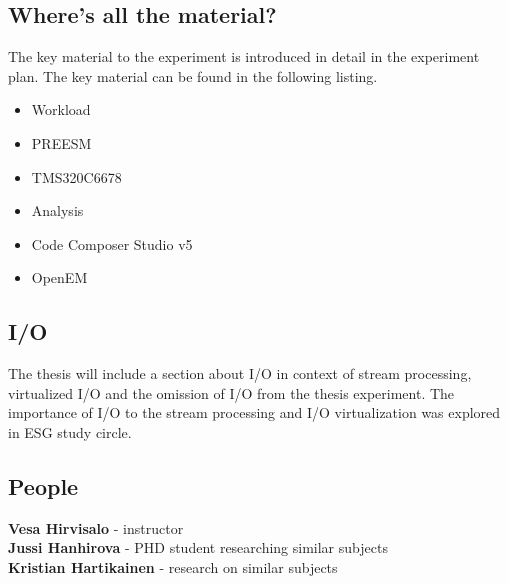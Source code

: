 \subsection{Where's all the material?}
The key material to the experiment is introduced in detail in the experiment plan. The key material can be found in the following listing.
\begin{itemize}
\item Workload
\item PREESM
\item TMS320C6678
\item Analysis
\item Code Composer Studio v5
\item OpenEM
\end{itemize}
\subsection{I/O}
The thesis will include a section about I/O in context of stream processing, virtualized I/O and the omission of I/O from the thesis experiment. The importance of I/O to the stream processing and I/O virtualization was explored in ESG study circle.
\subsection{People}
\textbf{Vesa Hirvisalo} - instructor \\
\textbf{Jussi Hanhirova} - PHD student researching similar subjects \\
\textbf{Kristian Hartikainen} - research on similar subjects